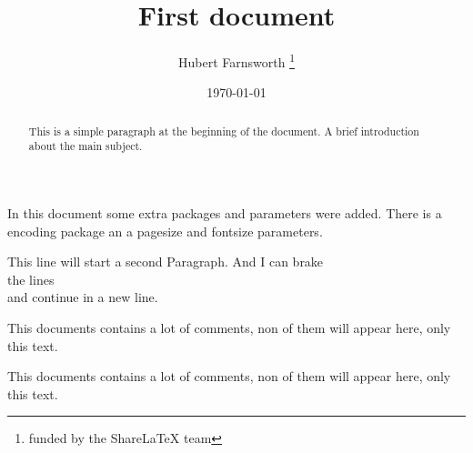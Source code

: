\documentclass[12pt, letterpaper]{article}
\title{First document}
\author{Hubert Farnsworth \thanks{funded by the ShareLaTeX team}}
\date{\today}
\begin{document}
 
\begin{titlepage}
\maketitle
\end{titlepage}
 
\begin{abstract}
This is a simple paragraph at the beginning of the 
document. A brief introduction about the main subject.
\end{abstract}
 
In this document some extra packages and parameters
were added. There is a encoding package
an a pagesize and fontsize parameters.
 
This line will start a second Paragraph. And I can
 brake\\ the lines \\and continue in a new line.

This documents contains a lot of comments, non of them
will appear here, only this text.
 
This documents contains a lot of comments, non of them
will appear here, only this text.
 
\begin{comment}
This text won't show up in the compiled pdf
this is just a multi-line comment. Useful
to, for instance, comment out slow-rendering
while working on the draft.
\end{comment}
 
\end{document}
